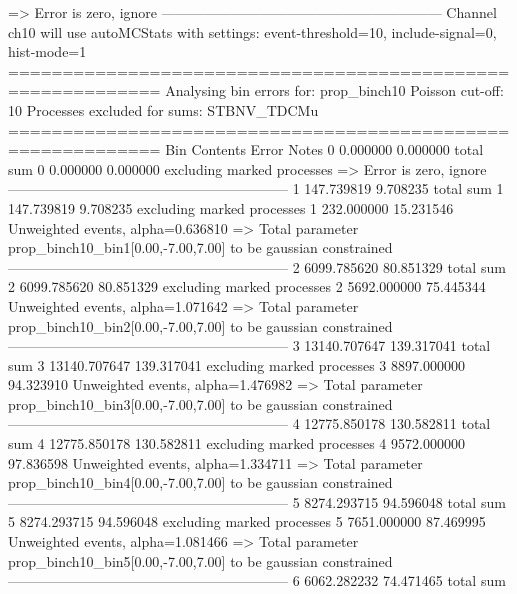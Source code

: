   => Error is zero, ignore      
------------------------------------------------------------
Channel ch10 will use autoMCStats with settings: event-threshold=10, include-signal=0, hist-mode=1
============================================================
Analysing bin errors for: prop_binch10
Poisson cut-off: 10
Processes excluded for sums: STBNV_TDCMu
============================================================
Bin        Contents        Error           Notes                         
0          0.000000        0.000000        total sum                     
0          0.000000        0.000000        excluding marked processes    
  => Error is zero, ignore      
------------------------------------------------------------
1          147.739819      9.708235        total sum                     
1          147.739819      9.708235        excluding marked processes    
1          232.000000      15.231546       Unweighted events, alpha=0.636810
  => Total parameter prop_binch10_bin1[0.00,-7.00,7.00] to be gaussian constrained
------------------------------------------------------------
2          6099.785620     80.851329       total sum                     
2          6099.785620     80.851329       excluding marked processes    
2          5692.000000     75.445344       Unweighted events, alpha=1.071642
  => Total parameter prop_binch10_bin2[0.00,-7.00,7.00] to be gaussian constrained
------------------------------------------------------------
3          13140.707647    139.317041      total sum                     
3          13140.707647    139.317041      excluding marked processes    
3          8897.000000     94.323910       Unweighted events, alpha=1.476982
  => Total parameter prop_binch10_bin3[0.00,-7.00,7.00] to be gaussian constrained
------------------------------------------------------------
4          12775.850178    130.582811      total sum                     
4          12775.850178    130.582811      excluding marked processes    
4          9572.000000     97.836598       Unweighted events, alpha=1.334711
  => Total parameter prop_binch10_bin4[0.00,-7.00,7.00] to be gaussian constrained
------------------------------------------------------------
5          8274.293715     94.596048       total sum                     
5          8274.293715     94.596048       excluding marked processes    
5          7651.000000     87.469995       Unweighted events, alpha=1.081466
  => Total parameter prop_binch10_bin5[0.00,-7.00,7.00] to be gaussian constrained
------------------------------------------------------------
6          6062.282232     74.471465       total sum                     
